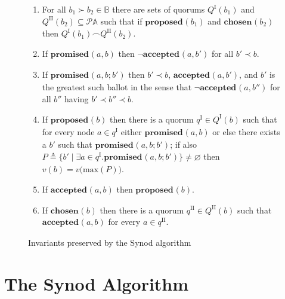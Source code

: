\documentclass[journal]{IEEEtran}
\begin{document}
\def\prep#1{\mathbf{prepare}(#1)}
\def\mprom#1#2#3{\mathbf{promised}_{\ge #1}(#2,#3)}
\def\fprom#1#2#3{\mathbf{promised}_{#1}(#2,#3)}
\def\bprom#1#2#3#4{\mathbf{promised}_{#1}(#2,#3;#4)}
\def\prop#1#2{\mathbf{proposed}_{#1}(#2)}
\def\acc#1#2#3{\mathbf{accepted}_{#1}(#2,#3)}
\def\chosen#1#2{\mathbf{chosen}_{#1}(#2)}
\def\owner#1{\mathrm{owner}(#1)}

\begin{figure*}[t!]
\caption{Invariants preserved by the Synod algorithm\label{synod-invariants-figure}}

\renewcommand{\theenumi}{S\arabic{enumi}}

\begin{enumerate}

\item \label{synod-quorums} For all $b_1 \succ b_2 \in \mathbb B$ there are
  sets of quorums $Q^\textrm{I}(b_1)$ and $Q^\textrm{II}(b_2) \subseteq
  \mathcal P \mathbb A$ such that if $\prop{}{b_1}$ and $\chosen{}{b_2}$ then
  ${Q^\textrm{I}(b_1) \frown Q^\textrm{II}(b_2)}$.

\item \label{synod-fprom} If $\fprom{}{a}{b}$ then $\neg\acc{}{a}{b'}$ for all
  ${b' \prec b}$.

\item \label{synod-bprom} If $\bprom{}{a}{b}{b'}$ then $b' \prec b$,
  $\acc{}{a}{b'}$, and $b'$ is the greatest such ballot in the sense that
  $\neg\acc{}{a}{b''}$ for all $b''$ having $b' \prec b'' \prec b$.

\item \label{synod-prop} If $\prop{}{b}$ then there is a quorum $q^\textrm{I}
  \in Q^\textrm{I}(b)$ such that for every node $a \in q^\textrm{I}$ either
  $\fprom{}{a}{b}$ or else there exists a $b'$ such that $\bprom{}{a}{b}{b'}$;
  if also ${P \triangleq \{ b' \mid \exists a \in q^\textrm{I}.
  \bprom{}{a}{b}{b'} \} \ne \varnothing}$ then $v(b) =
  v\bigl(\mathrm{max}(P)\bigr)$.

\item \label{synod-acc} If $\acc{}{a}{b}$ then $\prop{}{b}$.

\item \label{synod-chosen} If $\chosen{}{b}$ then there is a quorum
  $q^\textrm{II} \in Q^\textrm{II}(b)$ such that $\acc{}{a}{b}$ for every $a
  \in q^\textrm{II}$.

\end{enumerate}
\end{figure*}

\section{The Synod Algorithm}\label{synod-text}
\end{document}
